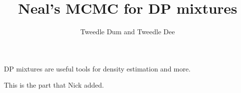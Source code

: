 \documentclass[11pt]{amsart}
\title{Neal's MCMC for DP mixtures}
\author{Tweedle Dum and Tweedle Dee}
\begin{document}
\maketitle

DP mixtures are useful tools for density estimation and more.



This is the part that Nick added.
\end{document}
